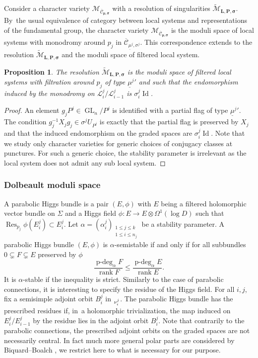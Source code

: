 \documentclass[JEP,XML,SOM,NoEqCountersInSection,Unicode,published]{cedram}
\newcommand{\NoChangel}[1]{%
\expandafter\let\csname old\string#1\endcsname=#1
\let#1=\relax
\newcommand{#1}{\mathcode`l="716C\csname old\string#1\endcsname\mathcode`l="7160 }%
}
\theoremstyle{definition}
\theoremstyle{plain}
\newtheorem{proposition}[definition]{Proposition}
\DeclareMathOperator{\Id}{Id}
\DeclareMathOperator{\Res}{Res}
\DeclareMathOperator{\GL}{GL}
\DeclareMathOperator{\rank}{rank}
\DeclareMathOperator{\gl}{\mathfrak{gl}}\NoChangel{\gl}
\DeclareMathOperator{\pdeg}{p-deg}
\newcommand{\inv}{^{-1}}
\newcommand{\mcmus}{\mathcal{M}_{\overline{\mathcal{C}}_{\boldsymbol{\mu},\boldsymbol{\sigma}}}}
\newcommand{\mlps}{\widetilde{\mathcal{M}}_{\boldsymbol{L},\boldsymbol{P},\boldsymbol{\sigma}}}
\begin{document}
Consider a character variety $\mcmus$ with a resolution of singularities $\widetilde{\mathcal{M}}_{\boldsymbol{L},\boldsymbol{P}, \boldsymbol{\sigma}}$. By~the usual equivalence of category between local systems and representations of the fundamental group, the character variety $\mcmus$ is the moduli space of local systems with monodromy around $p_{j}$ in $\overline{\mathcal{C}}_{\underline{\mu}^j,\sigma^j}$. This correspondence extends to the resolution $\mlps$ and the moduli space of filtered local system.
\begin{proposition}\label{proposition_filtered_moduli_resolu}
The resolution $\mlps$ is the moduli space of filtered local systems with filtration around $p_j$ of type ${\underline{\mu}^j}'$ and such that the endomorphism induced by the monodromy on $\mathcal{L}^j_i/\mathcal{L}^j_{i-1}$ is $\sigma^j_i \Id$.
\end{proposition}
\begin{proof}
An element $g_j P^j \in \GL_n /P^j$ is identified with a partial flag of type ${\underline{\mu}^j}'$.
The condition $g_j\inv X_j g_j \in \sigma^j U_{P^j}$
is exactly that the partial flag is preserved by $X_j$
and that the induced endomorphism on the graded spaces are $\sigma_i^j \Id$.
Note that we study only character varieties for generic choices of conjugacy classes at punctures. For such a generic choice, the stability parameter is irrelevant as the local system does not admit any sub local system.
\end{proof}

\subsubsection{Dolbeault moduli space}\label{subsect_dol_alg}
A parabolic Higgs bundle is a pair $(E,\phi)$ with $E$ being a filtered holomorphic vector bundle on $\Sigma$ and a Higgs field $\phi : E \to E\otimes \Omega^1(\log D) $ such that $\Res_{p_j}\phi (E^j_i)\subset E^j_i$. Let $\alpha =(\alpha^j_i)_{\substack{1\le j \le k \\ 1 \le i \le n_j}}$ be a stability parameter. A parabolic Higgs bundle $(E,\phi)$ is $\alpha$-semistable if and only if for all subbundles $0\subsetneq F\subsetneq E$ preserved by $\phi$
\[
\frac{\pdeg_{\alpha} F}{\rank F} \le \frac{\pdeg_{\alpha} E}{\rank E}.
\]
It is $\alpha$-stable if the inequality is strict.
Similarly to the case of parabolic connections, it is interesting to specify the residue of the Higgs field. For all $i,j$, fix a semisimple adjoint orbit $B^j_i$ in $\gl_{\nu^j_i}$. The parabolic Higgs bundle has the prescribed residues if, in~a holomorphic trivialization, the map induced on $E^j_i / E^j_{i-1}$ by the residue lies in the adjoint orbit $B^j_i$. Note that contrarily to the parabolic connections, the prescribed adjoint orbits on the graded spaces are not necessarily central. In fact much more general polar parts are considered by Biquard--Boalch \cite{Biquard_Boalch_2004}, we restrict here to what is necessary for our purpose.
\end{document}
